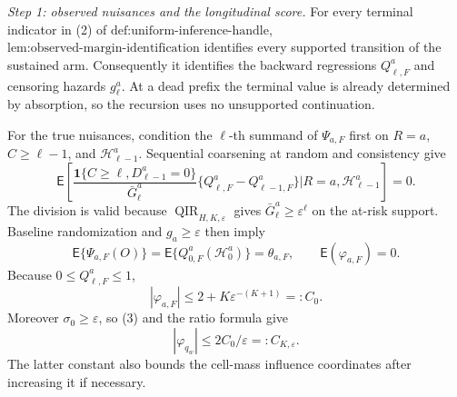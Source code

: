 \emph{Step 1: observed nuisances and the longitudinal score.}
For every terminal indicator in (2) of \(\text{def:uniform-inference-handle}\), \(\text{lem:observed-margin-identification}\) identifies every supported transition of the sustained arm.  Consequently it identifies the backward regressions \(Q_{\ell,F}^a\) and censoring hazards \(g_\ell^a\).  At a dead prefix the terminal value is already determined by absorption, so the recursion uses no unsupported continuation.

For the true nuisances, condition the \(\ell\)-th summand of \(\Psi_{a,F}\) first on \(R=a\), \(C\ge\ell-1\), and \(\mathcal H_{\ell-1}^a\).  Sequential coarsening at random and consistency give
\[
 \mathsf E\!\left[
 \frac{\mathbf 1\{C\ge\ell,D_{\ell-1}^a=0\}}{\bar G_\ell^a}
 \{Q_{\ell,F}^a-Q_{\ell-1,F}^a\}
 \mathrel{\Big|} R=a,\mathcal H_{\ell-1}^a\right]=0.       \tag{1}
\]
The division is valid because \(\operatorname{QIR}_{H,K,\varepsilon}\) gives \(\bar G_\ell^a\ge\varepsilon^\ell\) on the at-risk support.  Baseline randomization and \(g_a\ge\varepsilon\) then imply
\[
 \mathsf E\{\Psi_{a,F}(O)\}=\mathsf E\{Q_{0,F}^a(\mathcal H_0^a)\}=\theta_{a,F},
 \qquad \mathsf E(\varphi_{a,F})=0.                       \tag{2}
\]
Because \(0\le Q_{\ell,F}^a\le1\),
\[
 |\varphi_{a,F}|
 \le 2+K\varepsilon^{-(K+1)}=:C_0.                       \tag{3}
\]
Moreover \(\sigma_0\ge\varepsilon\), so (3) and the ratio formula give
\[
 |\varphi_{q_w}|\le 2C_0/\varepsilon=:C_{K,\varepsilon}. \tag{4}
\]
The latter constant also bounds the cell-mass influence coordinates after increasing it if necessary.

